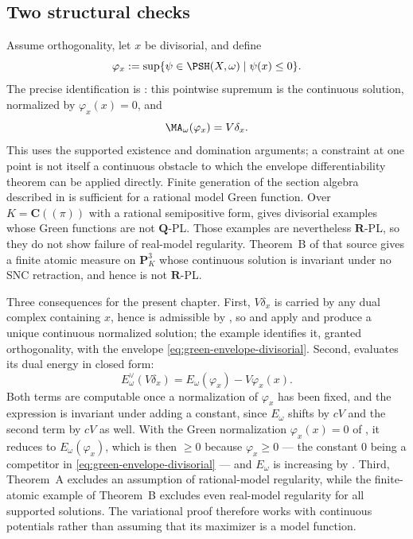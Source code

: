 \subsection{Two structural checks}
\label{sec:ch28-two-checks}

\begin{example}
\label{ex:ch28-divisorial-green}
Assume orthogonality, let $x$ be divisorial, and define
\begin{equation}
\label{eq:green-envelope-divisorial}
 \varphi_x:=\sup\{\psi\in\PSH(X,\omega)\mid\psi(x)\leq0\}.
\end{equation}
The precise identification is \cite[Lemma~8.5 and equation~(8.7)]{BFJ15}:
this pointwise supremum is the continuous solution, normalized by
$\varphi_x(x)=0$, and
\[
                      \MA_\omega(\varphi_x)=V\delta_x.
\]
This uses the supported existence and domination arguments; a constraint
at one point is not itself a continuous obstacle to which the envelope
differentiability theorem can be applied directly.
Finite generation of the section algebra described in
\cite[Remark~8.8]{BFJ15} is sufficient for a rational model Green function.
Over $K=\mathbf C((\pi))$ with a rational semipositive form,
\cite[Theorem~A(ii)]{BJGreen24} gives divisorial examples whose Green
functions are not $\mathbf Q$-PL.  Those examples are nevertheless
$\mathbf R$-PL, so they do not show failure of real-model regularity.
Theorem~B of that source gives a finite atomic measure on
$\mathbf P^3_K$ whose continuous solution is invariant under no SNC
retraction, and hence is not $\mathbf R$-PL.

Three consequences for the present chapter.  First, $V\delta_x$ is carried
by any dual complex containing $x$, hence is admissible by
, so
 and
 apply and produce a unique continuous normalized
solution; the example identifies it, granted orthogonality, with the
envelope \eqref{eq:green-envelope-divisorial}.  Second,
 evaluates its dual energy in closed form:
\[
 E^\vee_\omega(V\delta_x)=E_\omega(\varphi_x)-V\varphi_x(x).
\]
Both terms are computable once a normalization of $\varphi_x$ has been
fixed, and the expression is invariant under adding a constant, since
$E_\omega$ shifts by $cV$ and the second term by $cV$ as well.  With
the Green normalization $\varphi_x(x)=0$ of \cite{BJGreen24}, it reduces to
$E_\omega(\varphi_x)$, which is then $\geq0$ because $\varphi_x\geq0$
--- the constant $0$ being a competitor in
\eqref{eq:green-envelope-divisorial} --- and $E_\omega$ is increasing by
.  Third, Theorem~A excludes an assumption of rational-model
regularity, while the finite-atomic example of Theorem~B excludes even
real-model regularity for all supported solutions.  The variational
proof therefore works with continuous potentials rather than assuming
that its maximizer is a model function.
\end{example}

